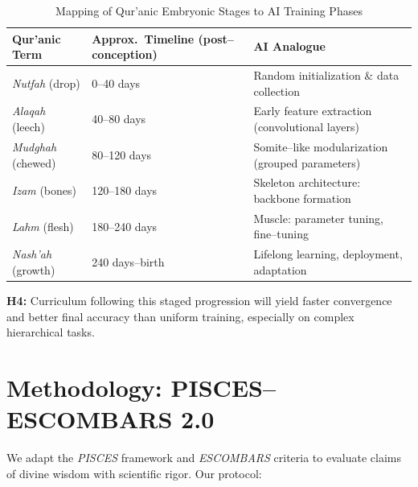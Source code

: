 \documentclass[12pt,twocolumn]{article}
\begin{document}
\begin{table}[h]
\centering
\caption{Mapping of Qur'anic Embryonic Stages to AI Training Phases}
\label{tab:stages}
\begin{tabular}{@{}lll@{}}
\toprule
Qur'anic Term & Approx.\ Timeline (post--conception) & AI Analogue \\
\midrule
\emph{Nutfah} (drop) & 0--40 days & Random initialization $\&$ data collection \\
\emph{Alaqah} (leech) & 40--80 days & Early feature extraction (convolutional layers) \\
\emph{Mudghah} (chewed) & 80--120 days & Somite--like modularization (grouped parameters) \\
\emph{Izam} (bones) & 120--180 days & Skeleton architecture: backbone formation \\
\emph{Lahm} (flesh) & 180--240 days & Muscle: parameter tuning, fine--tuning \\
\emph{Nash'ah} (growth) & 240 days--birth & Lifelong learning, deployment, adaptation \\
\bottomrule
\end{tabular}
\end{table}

\textbf{H4:} Curriculum following this staged progression will yield faster convergence and better final accuracy than uniform training, especially on complex hierarchical tasks.

\section{Methodology: PISCES--ESCOMBARS 2.0}
We adapt the \emph{PISCES} framework \citep{Suparno2023} and \emph{ESCOMBARS} criteria to evaluate claims of divine wisdom with scientific rigor. Our protocol:
\end{document}
